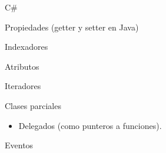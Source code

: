 \documentclass{beamer}
\begin{document}
\begin{frame}{C\#}
  \begin{exampleblock}{Propiedades (getter y setter en Java)}
    
  \end{exampleblock}
\end{frame}

\begin{frame}
  \begin{exampleblock}{Indexadores}
    
  \end{exampleblock}
\end{frame}

\begin{frame}
  \begin{exampleblock}{Atributos}
    
  \end{exampleblock}
\end{frame}

\begin{frame}
  \begin{exampleblock}{Iteradores}
    \begin{scriptsize}
      
    \end{scriptsize}
  \end{exampleblock}
\end{frame}

\begin{frame}
  \begin{exampleblock}{Clases parciales}
    \begin{scriptsize}
      
    \end{scriptsize}
  \end{exampleblock}
\end{frame}

\begin{frame}
  \begin{itemize}
    \item Delegados (como punteros a funciones).
  \end{itemize}

  \pause
  \begin{exampleblock}{Eventos}
    \begin{scriptsize}
      
    \end{scriptsize}
  \end{exampleblock}
\end{frame}
\end{document}
